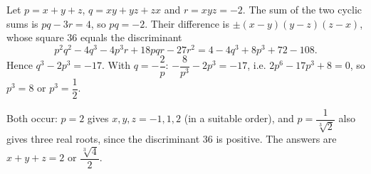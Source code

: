 Let $p=x+y+z$, $q=xy+yz+zx$ and $r=xyz=-2$. The sum of the two cyclic sums is $pq-3r=4$, so $pq=-2$. Their difference is $\pm(x-y)(y-z)(z-x)$, whose square $36$ equals the discriminant
\[p^2q^2-4q^3-4p^3r+18pqr-27r^2=4-4q^3+8p^3+72-108.\]
Hence $q^3-2p^3=-17$. With $q=-\dfrac2p$: $-\dfrac8{p^3}-2p^3=-17$, i.e. $2p^6-17p^3+8=0$, so $p^3=8$ or $p^3=\dfrac12$.

Both occur: $p=2$ gives $x,y,z=-1,1,2$ (in a suitable order), and $p=\dfrac1{\sqrt[3]2}$ also gives three real roots, since the discriminant $36$ is positive. The answers are $\boxed{x+y+z=2\text{ or }\dfrac{\sqrt[3]4}2}$.
